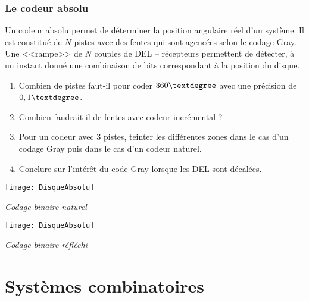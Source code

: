\subsubsection{Le codeur absolu}

Un codeur absolu permet de déterminer la position angulaire réel d'un système. Il est constitué de $N$ pistes avec des fentes qui sont agencées selon le codage Gray. Une <<rampe>> de $N$ couples de DEL -- récepteurs permettent de détecter, à un instant donné une combinaison de bits correspondant à la position du disque. 

\begin{exemple}
\begin{enumerate}
\item Combien de pistes faut-il pour coder $360 \textdegree$ avec une précision de $0,1 \textdegree$. 
\item Combien faudrait-il de fentes avec codeur incrémental ? 
\item Pour un codeur avec 3 pistes, teinter les différentes zones dans le cas d'un codage Gray puis dans le cas d'un codeur naturel.
\item Conclure sur l'intérêt du code Gray lorsque les DEL sont décalées. 
\end{enumerate}

\begin{minipage}[c]{.45\linewidth}
\begin{center}
\texttt{[image: DisqueAbsolu]}

\textit{Codage binaire naturel}
\end{center}
\end{minipage} \hfill
\begin{minipage}[c]{.45\linewidth}
\begin{center}
\texttt{[image: DisqueAbsolu]}

\textit{Codage binaire réfléchi}
\end{center}
\end{minipage}


\end{exemple}

\section{Systèmes combinatoires}
%
%
%
%


